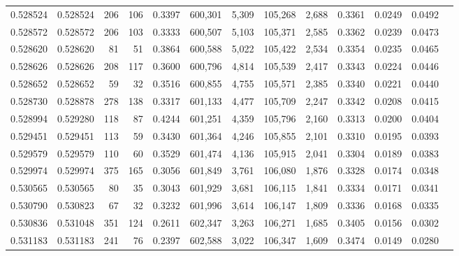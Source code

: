 \begin{tabular}{rrrrrrrrrrrrr}
0.528524 & 0.528524 &   206 &   106 &                                     0.3397 & 600,301 &   5,309 & 105,268 &   2,688 & 0.3361 & 0.0249 & 0.0492 \\
0.528572 & 0.528572 &   206 &   103 &                                     0.3333 & 600,507 &   5,103 & 105,371 &   2,585 & 0.3362 & 0.0239 & 0.0473 \\
0.528620 & 0.528620 &    81 &    51 &                                     0.3864 & 600,588 &   5,022 & 105,422 &   2,534 & 0.3354 & 0.0235 & 0.0465 \\
0.528626 & 0.528626 &   208 &   117 &                                     0.3600 & 600,796 &   4,814 & 105,539 &   2,417 & 0.3343 & 0.0224 & 0.0446 \\
0.528652 & 0.528652 &    59 &    32 &                                     0.3516 & 600,855 &   4,755 & 105,571 &   2,385 & 0.3340 & 0.0221 & 0.0440 \\
0.528730 & 0.528878 &   278 &   138 &                                     0.3317 & 601,133 &   4,477 & 105,709 &   2,247 & 0.3342 & 0.0208 & 0.0415 \\
0.528994 & 0.529280 &   118 &    87 &                                     0.4244 & 601,251 &   4,359 & 105,796 &   2,160 & 0.3313 & 0.0200 & 0.0404 \\
0.529451 & 0.529451 &   113 &    59 &                                     0.3430 & 601,364 &   4,246 & 105,855 &   2,101 & 0.3310 & 0.0195 & 0.0393 \\
0.529579 & 0.529579 &   110 &    60 &                                     0.3529 & 601,474 &   4,136 & 105,915 &   2,041 & 0.3304 & 0.0189 & 0.0383 \\
0.529974 & 0.529974 &   375 &   165 &                                     0.3056 & 601,849 &   3,761 & 106,080 &   1,876 & 0.3328 & 0.0174 & 0.0348 \\
0.530565 & 0.530565 &    80 &    35 &                                     0.3043 & 601,929 &   3,681 & 106,115 &   1,841 & 0.3334 & 0.0171 & 0.0341 \\
0.530790 & 0.530823 &    67 &    32 &                                     0.3232 & 601,996 &   3,614 & 106,147 &   1,809 & 0.3336 & 0.0168 & 0.0335 \\
0.530836 & 0.531048 &   351 &   124 &                                     0.2611 & 602,347 &   3,263 & 106,271 &   1,685 & 0.3405 & 0.0156 & 0.0302 \\
0.531183 & 0.531183 &   241 &    76 &                                     0.2397 & 602,588 &   3,022 & 106,347 &   1,609 & 0.3474 & 0.0149 & 0.0280 \\

\end{tabular}
